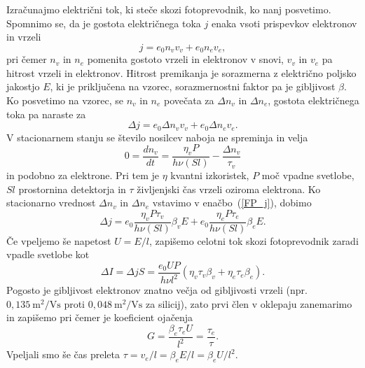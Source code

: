 Izračunajmo električni tok, ki steče skozi fotoprevodnik, ko nanj posvetimo. 
Spomnimo se, da je gostota električnega toka $j$ enaka vsoti prispevkov elektronov 
 in vrzeli
\begin{equation}
j = e_0 n_v v_v + e_0 n_e v_e,
\end{equation}
pri čemer $n_v$ in $n_e$ pomenita gostoto vrzeli in elektronov v snovi, $v_v$ in $v_e$ pa 
hitrost vrzeli in elektronov. Hitrost premikanja 
je sorazmerna z električno poljsko jakostjo $E$, ki je priključena
 na vzorec, sorazmernostni faktor pa je  gibljivost $\beta$. Ko posvetimo na vzorec, 
 se $n_v$ in $n_e$ povečata za $\Delta n_v$ in $\Delta n_e$,
gostota električnega toka pa naraste za
\begin{equation}
\Delta j = e_0 \Delta n_v v_v + e_0 \Delta n_e v_e.
\label{FP_j}
\end{equation}
V stacionarnem stanju se število nosilcev naboja ne spreminja in velja
\begin{equation}
0 = \frac{dn_v}{dt} = \frac{\eta_v P}{h \nu (Sl)} - \frac{\Delta n_v}{\tau_v}
\end{equation}
in podobno za elektrone. Pri tem je $\eta$ kvantni izkoristek, 
$P$ moč vpadne svetlobe,
$Sl$ prostornina detektorja in $\tau$ življenjski čas vrzeli oziroma elektrona. 
Ko stacionarno vrednost $\Delta n_v$ in $\Delta n_e$ vstavimo v enačbo~(\ref{FP_j}), dobimo
\begin{equation}
\Delta j = e_0 \frac{\eta_v P \tau_v}{h \nu (Sl)} \beta_v  E + 
e_0 \frac{\eta_e P \tau_e}{h \nu (Sl)} \beta_e  E.
\end{equation}
Če vpeljemo še napetost $U = E/l$, zapišemo celotni tok skozi fotoprevodnik zaradi 
vpadle svetlobe kot
\begin{equation}
\Delta I = \Delta j S = \frac{e_0 U P }{h \nu l^2} \left(\eta_v \tau_v \beta_v + 
\eta_e \tau_e \beta_e \right).
\end{equation}
Pogosto je gibljivost elektronov znatno večja od gibljivosti vrzeli (npr.
$0,135~\si{\meter}^2/\si{\volt\second}$ proti $0,048~\si{\meter}^2/\si{\volt\second}$ za silicij), 
 zato prvi člen v oklepaju zanemarimo in zapišemo
pri čemer je koeficient ojačenja 
\begin{equation}
G = \frac{\beta_e \tau_e U}{l^2} = \frac{\tau_e}{\tau}.
\end{equation}
Vpeljali smo še čas preleta $\tau = v_e/l = \beta_e E/l = \beta_e U/l^2$.

